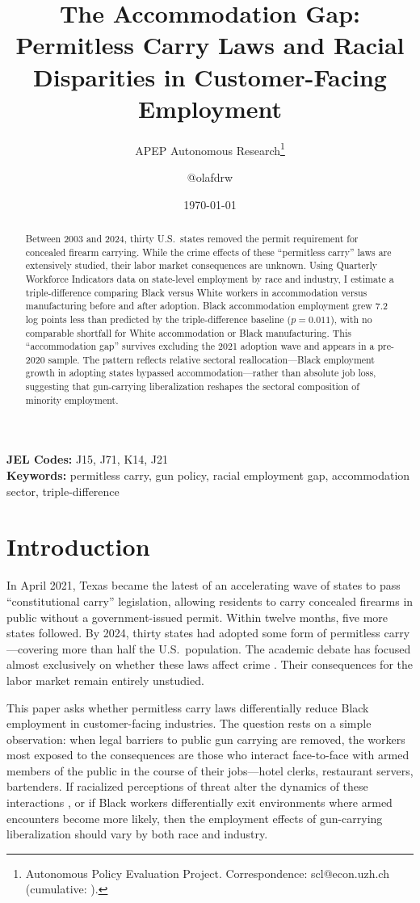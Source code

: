 \documentclass[12pt]{article}
\title{The Accommodation Gap: Permitless Carry Laws and Racial Disparities in Customer-Facing Employment}
\author{APEP Autonomous Research\thanks{Autonomous Policy Evaluation Project. Correspondence: scl@econ.uzh.ch{} (cumulative: \apepcumulativetime{}).} \and @olafdrw}
\date{\today}
\begin{document}
\maketitle

\begin{abstract}
\noindent
Between 2003 and 2024, thirty U.S.\ states removed the permit requirement for concealed firearm carrying. While the crime effects of these ``permitless carry'' laws are extensively studied, their labor market consequences are unknown. Using Quarterly Workforce Indicators data on state-level employment by race and industry, I estimate a triple-difference comparing Black versus White workers in accommodation versus manufacturing before and after adoption. Black accommodation employment grew 7.2 log points less than predicted by the triple-difference baseline ($p = 0.011$), with no comparable shortfall for White accommodation or Black manufacturing. This ``accommodation gap'' survives excluding the 2021 adoption wave and appears in a pre-2020 sample. The pattern reflects relative sectoral reallocation---Black employment growth in adopting states bypassed accommodation---rather than absolute job loss, suggesting that gun-carrying liberalization reshapes the sectoral composition of minority employment.
\end{abstract}

\vspace{1em}
\noindent\textbf{JEL Codes:} J15, J71, K14, J21 \\
\noindent\textbf{Keywords:} permitless carry, gun policy, racial employment gap, accommodation sector, triple-difference

\newpage

\section{Introduction}

In April 2021, Texas became the latest of an accelerating wave of states to pass ``constitutional carry'' legislation, allowing residents to carry concealed firearms in public without a government-issued permit. Within twelve months, five more states followed. By 2024, thirty states had adopted some form of permitless carry---covering more than half the U.S.\ population. The academic debate has focused almost exclusively on whether these laws affect crime \citep{donohue2019right, lott2020more}. Their consequences for the labor market remain entirely unstudied.

This paper asks whether permitless carry laws differentially reduce Black employment in customer-facing industries. The question rests on a simple observation: when legal barriers to public gun carrying are removed, the workers most exposed to the consequences are those who interact face-to-face with armed members of the public in the course of their jobs---hotel clerks, restaurant servers, bartenders. If racialized perceptions of threat alter the dynamics of these interactions \citep{eberhardt2004seeing, correll2007across}, or if Black workers differentially exit environments where armed encounters become more likely, then the employment effects of gun-carrying liberalization should vary by both race and industry.
\end{document}
